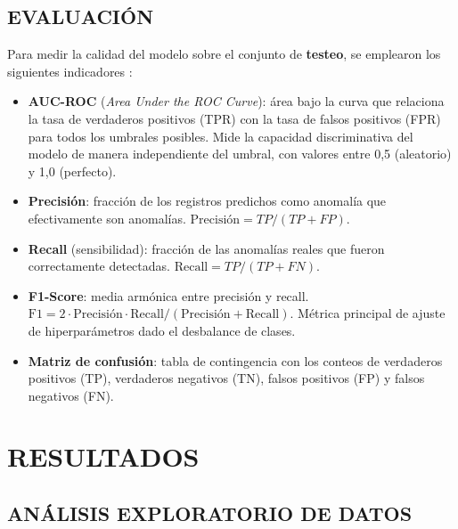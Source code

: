 \documentclass[12pt,letterpaper, oneside]{book}
\begin{document}
    \section{EVALUACIÓN}

    Para medir la calidad del modelo sobre el conjunto de \textbf{testeo},
    se emplearon los siguientes indicadores \citep{fawcett2006introduction}:

    \begin{itemize}
        \item \textbf{AUC-ROC} (\textit{Area Under the ROC Curve}): área
        bajo la curva que relaciona la tasa de verdaderos positivos (TPR)
        con la tasa de falsos positivos (FPR) para todos los umbrales
        posibles. Mide la capacidad discriminativa del modelo de manera
        independiente del umbral, con valores entre 0,5 (aleatorio) y
        1,0 (perfecto).

        \item \textbf{Precisión}: fracción de los registros predichos
        como anomalía que efectivamente son anomalías.
        $\text{Precisión} = TP / (TP + FP)$.

        \item \textbf{Recall} (sensibilidad): fracción de las anomalías
        reales que fueron correctamente detectadas.
        $\text{Recall} = TP / (TP + FN)$.

        \item \textbf{F1-Score}: media armónica entre precisión y recall.
        $\text{F1} = 2 \cdot \text{Precisión} \cdot \text{Recall} /
        (\text{Precisión} + \text{Recall})$. Métrica principal de
        ajuste de hiperparámetros dado el desbalance de clases.

        \item \textbf{Matriz de confusión}: tabla de contingencia con
        los conteos de verdaderos positivos (TP), verdaderos negativos
        (TN), falsos positivos (FP) y falsos negativos (FN).
    \end{itemize}

    \chapter{RESULTADOS}

    \section{ANÁLISIS EXPLORATORIO DE DATOS}
\end{document}
